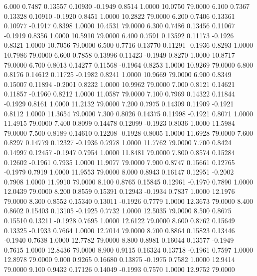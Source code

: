    6.000   0.7487   0.13557   0.10930  -0.1949   0.8514   1.0000  10.0750  79.0000
   6.100   0.7367   0.13328   0.10910  -0.1920   0.8451   1.0000  10.2822  79.0000
   6.200   0.7406   0.13361   0.10977  -0.1917   0.8398   1.0000  10.4531  79.0000
   6.300   0.7486   0.13456   0.11067  -0.1919   0.8356   1.0000  10.5910  79.0000
   6.400   0.7591   0.13592   0.11173  -0.1926   0.8321   1.0000  10.7056  79.0000
   6.500   0.7716   0.13770   0.11291  -0.1936   0.8293   1.0000  10.7986  79.0000
   6.600   0.7858   0.13996   0.11423  -0.1949   0.8270   1.0000  10.8717  79.0000
   6.700   0.8013   0.14277   0.11568  -0.1964   0.8253   1.0000  10.9269  79.0000
   6.800   0.8176   0.14612   0.11725  -0.1982   0.8241   1.0000  10.9669  79.0000
   6.900   0.8349   0.15007   0.11894  -0.2001   0.8232   1.0000  10.9962  79.0000
   7.000   0.8121   0.14621   0.11857  -0.1960   0.8212   1.0000  11.0587  79.0000
   7.100   0.7969   0.14322   0.11844  -0.1929   0.8161   1.0000  11.2132  79.0000
   7.200   0.7975   0.14309   0.11909  -0.1921   0.8112   1.0000  11.3654  79.0000
   7.300   0.8026   0.14375   0.11998  -0.1921   0.8071   1.0000  11.4915  79.0000
   7.400   0.8099   0.14478   0.12099  -0.1923   0.8036   1.0000  11.5984  79.0000
   7.500   0.8189   0.14610   0.12208  -0.1928   0.8005   1.0000  11.6928  79.0000
   7.600   0.8297   0.14779   0.12327  -0.1936   0.7978   1.0000  11.7762  79.0000
   7.700   0.8424   0.14997   0.12457  -0.1947   0.7954   1.0000  11.8481  79.0000
   7.800   0.8574   0.15284   0.12602  -0.1961   0.7935   1.0000  11.9077  79.0000
   7.900   0.8747   0.15661   0.12765  -0.1979   0.7919   1.0000  11.9553  79.0000
   8.000   0.8943   0.16147   0.12951  -0.2002   0.7908   1.0000  11.9910  79.0000
   8.100   0.8765   0.15845   0.12961  -0.1970   0.7890   1.0000  12.0439  79.0000
   8.200   0.8559   0.15391   0.12943  -0.1934   0.7837   1.0000  12.1976  79.0000
   8.300   0.8552   0.15340   0.13011  -0.1926   0.7779   1.0000  12.3673  79.0000
   8.400   0.8602   0.15403   0.13105  -0.1925   0.7732   1.0000  12.5035  79.0000
   8.500   0.8675   0.15510   0.13211  -0.1928   0.7695   1.0000  12.6122  79.0000
   8.600   0.8762   0.15649   0.13325  -0.1933   0.7664   1.0000  12.7014  79.0000
   8.700   0.8864   0.15823   0.13446  -0.1940   0.7638   1.0000  12.7782  79.0000
   8.800   0.8981   0.16044   0.13577  -0.1949   0.7615   1.0000  12.8436  79.0000
   8.900   0.9115   0.16324   0.13718  -0.1961   0.7597   1.0000  12.8978  79.0000
   9.000   0.9265   0.16680   0.13875  -0.1975   0.7582   1.0000  12.9414  79.0000
   9.100   0.9432   0.17126   0.14049  -0.1993   0.7570   1.0000  12.9752  79.0000
